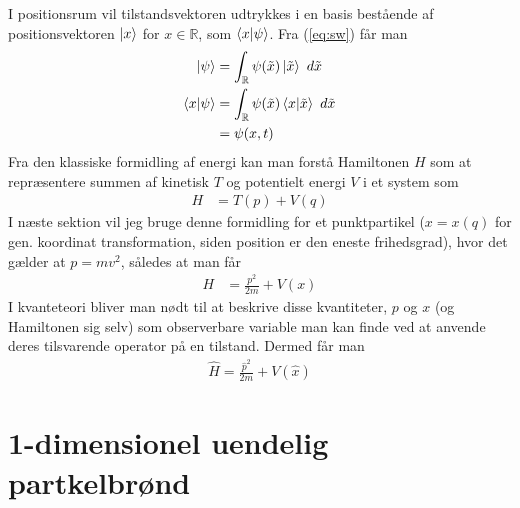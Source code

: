 \documentclass[12pt]{article}
\theoremstyle{definition}
\theoremstyle{remark}
\theoremstyle{definition}
\numberwithin{equation}{section}
\begin{document}
I positionsrum vil tilstandsvektoren udtrykkes i en basis bestående af positionsvektoren ${\ket x}$ for $x\in \mathbb R$, som $\braket{x}{\psi}$. Fra (\ref{eq:sw}) får man 
\begin{align*}
    \ket{\psi} &= \int_{\mathbb R} \psi(\tilde x)\ket{\tilde x}~d\tilde x \\
    \braket{x}{\psi} &= \int_{\mathbb R} \psi(\tilde x)\braket{x}{\tilde x}~d\tilde x \\
    &= \psi(x,t)
\end{align*}
Fra den klassiske formidling af energi kan man forstå Hamiltonen $H$ som at repræsentere summen af kinetisk $T$ og potentielt energi $V$ i et system \parencite{hamill} som
\begin{align}
    H &= T(p)+V(q)
\end{align}
I næste sektion vil jeg bruge denne formidling for et punktpartikel ($x=x(q)$ for gen. koordinat transformation, siden position er den eneste frihedsgrad), hvor det gælder at $p=mv^2$, således at man får
\begin{align}
    H &= \frac{p^2}{2m} + V(x)
\end{align}
I kvanteteori bliver man nødt til at beskrive disse kvantiteter, $p$ og $x$ (og Hamiltonen sig selv) som observerbare variable man kan finde ved at anvende deres tilsvarende operator på en tilstand. Dermed får man
\begin{align}
    \hat H = \frac{\hat p^2}{2m}+V(\hat x)
\end{align}

\newpage
\section{1-dimensionel uendelig partkelbrønd}
\end{document}
